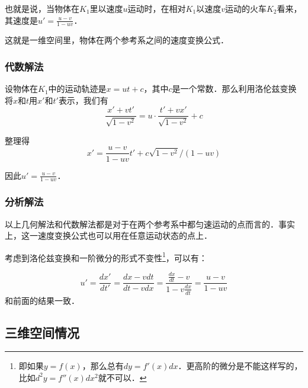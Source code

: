也就是说，当物体在$K_1$里以速度$u$运动时，在相对$K_1$以速度$v$运动的火车$K_2$看来，其速度是$u'=\frac{u-v}{1-uv}$．

这就是一维空间里，物体在两个参考系之间的速度变换公式．

\subsubsection{代数解法}

设物体在$K_1$中的运动轨迹是$x=ut+c$，其中$c$是一个常数．那么利用洛伦兹变换将$x$和$t$用$x'$和$t'$表示，我们有$$\frac{x'+vt'}{\sqrt{1-v^2}}=u\cdot\frac{t'+vx'}{\sqrt{1-v^2}}+c$$

整理得$$x'=\frac{u-v}{1-uv}t'+c\sqrt{1-v^2}/(1-uv)$$

因此$u'=\frac{u-v}{1-uv}$．

\subsubsection{分析解法}

以上几何解法和代数解法都是对于在两个参考系中都匀速运动的点而言的．事实上，这一速度变换公式也可以用在任意运动状态的点上．

考虑到洛伦兹变换和一阶微分的形式不变性\footnote{即如果$y=f(x)$，那么总有$dy=f'(x)dx$．更高阶的微分是不能这样写的，比如$d^2y=f''(x)dx^2$就不可以．}，可以有：

$$u'=\frac{dx'}{dt'}=\frac{dx-vdt}{dt-vdx}=\frac{\frac{dx}{dt}-v}{1-v\frac{dx}{dt}}=\frac{u-v}{1-uv}$$和前面的结果一致．


\subsection{三维空间情况}





